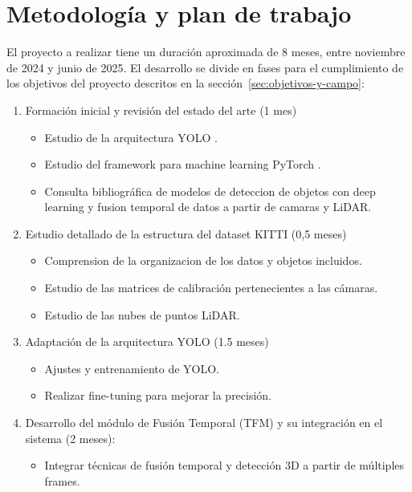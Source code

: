 \section{Metodología y plan de trabajo}
\label{sec:metodologia-y-plan}

El proyecto a realizar tiene un duración aproximada de 8 meses, entre noviembre de 2024 y junio de 2025. El desarrollo se divide en fases para el cumplimiento de los objetivos del proyecto descritos en la sección~\ref{sec:objetivos-y-campo}:

\begin{enumerate}
  
\item Formación inicial y revisión del estado del arte (1 mes)
  \begin{itemize}
  \item Estudio de la arquitectura YOLO \cite{yolo}.
  \item Estudio del framework para machine learning PyTorch \cite{pytorch}.
  \item Consulta bibliográfica de modelos de deteccion de objetos con deep learning y fusion temporal de datos a partir de camaras y LiDAR. 
  \end{itemize}

\item Estudio detallado de la estructura del dataset KITTI (0,5 meses)
\begin{itemize}
	\item Comprension de la organizacion de los datos y objetos incluidos.
	\item Estudio de las matrices de calibración pertenecientes a las cámaras.
	\item Estudio de las nubes de puntos LiDAR.
\end{itemize}
	

\item Adaptación de la arquitectura YOLO (1.5 meses)
  \begin{itemize}
  \item Ajustes y entrenamiento de YOLO.
  \item Realizar fine-tuning para mejorar la precisión.
  \end{itemize}
  

\item Desarrollo del módulo de Fusión Temporal (TFM) y su integración en el sistema (2 meses):
  \begin{itemize}
  \item Integrar técnicas de fusión temporal y detección 3D a partir de múltiples frames.
  \end{itemize}


\end{enumerate}
